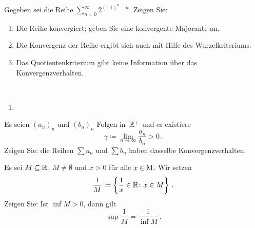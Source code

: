 \bigskip

\begin{aufg}[6 Punkte]
Gegeben sei die Reihe $\sum\limits_{n=0}^\infty 2^{(-1)^n-n}$. Zeigen Sie:
\begin{enumerate}[label=$\mathrm{(\roman*)}$, ref=$\mathrm{\roman*}$]
\item Die Reihe konvergiert; geben Sie eine konvergente Majorante an.
\item Die Konvergenz der Reihe ergibt sich auch mit Hilfe des Wurzelkriteriums.
\item Das Quotientenkriterium gibt keine Information \"uber das Konvergenzverhalten.
\end{enumerate}
\end{aufg}
 
\bigskip

\begin{lsg}\mbox{ }
\begin{enumerate}[label=$\mathrm{(\roman*)}$, ref=$\mathrm{\roman*}$]
\item 
\end{enumerate}
\end{lsg}


\bigskip


\begin{aufg}[6 Punkte]
Es seien $(a_n)_n$ und $(b_n)_n$ Folgen in~$\mathbb{R}^+$ und es existiere 
\[
 \gamma\coloneqq \lim_{n\to\infty} \frac{a_n}{b_n} > 0\,.
\]
Zeigen Sie: die Reihen $\sum a_n$ und $\sum b_n$ haben dasselbe Konvergenzverhalten.
\end{aufg}


\bigskip

\begin{lsg}  
\end{lsg}


\bigskip

\begin{aufg}\label{aufg:sonder1}
Es sei $M\subseteq\mathbb{R}$, $M\not=\emptyset$ und $x>0$ f\"ur alle $x\in\operatorname{M}$. Wir setzen
\[
 \frac1M \coloneqq \left\{ \frac1x \in \mathbb{R} \colon x\in M \right\}\,.
\]
Zeigen Sie: Ist $\inf M >0$, dann gilt 
\[
 \sup \frac1M = \frac{1}{\inf M}\,.
\]
\end{aufg}

\bigskip

\begin{lsg}
\end{lsg}

\bigskip 

